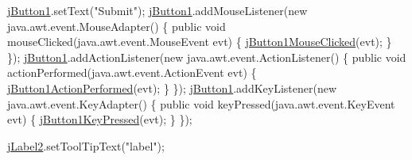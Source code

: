 \begin{DoxyCode}
        \hyperlink{classcom_1_1poly_1_1nlp_1_1filekommander_1_1views_1_1_file_kommander_g_u_i_a7fdc3f53573570f3f345be50e76a0f53}{jButton1}.setText(\textcolor{stringliteral}{"Submit"});
        \hyperlink{classcom_1_1poly_1_1nlp_1_1filekommander_1_1views_1_1_file_kommander_g_u_i_a7fdc3f53573570f3f345be50e76a0f53}{jButton1}.addMouseListener(\textcolor{keyword}{new} java.awt.event.MouseAdapter() \{
            \textcolor{keyword}{public} \textcolor{keywordtype}{void} mouseClicked(java.awt.event.MouseEvent evt) \{
                \hyperlink{classcom_1_1poly_1_1nlp_1_1filekommander_1_1views_1_1_file_kommander_g_u_i_aeaa83ab2594c30896c87c01f5678c8a4}{jButton1MouseClicked}(evt);
            \}
        \});
        \hyperlink{classcom_1_1poly_1_1nlp_1_1filekommander_1_1views_1_1_file_kommander_g_u_i_a7fdc3f53573570f3f345be50e76a0f53}{jButton1}.addActionListener(\textcolor{keyword}{new} java.awt.event.ActionListener() 
      \{
            \textcolor{keyword}{public} \textcolor{keywordtype}{void} actionPerformed(java.awt.event.ActionEvent evt) \{
                \hyperlink{classcom_1_1poly_1_1nlp_1_1filekommander_1_1views_1_1_file_kommander_g_u_i_a01d394178f39508f4fed1735790ba590}{jButton1ActionPerformed}(evt);
            \}
        \});
        \hyperlink{classcom_1_1poly_1_1nlp_1_1filekommander_1_1views_1_1_file_kommander_g_u_i_a7fdc3f53573570f3f345be50e76a0f53}{jButton1}.addKeyListener(\textcolor{keyword}{new} java.awt.event.KeyAdapter() \{
            \textcolor{keyword}{public} \textcolor{keywordtype}{void} keyPressed(java.awt.event.KeyEvent evt) \{
                \hyperlink{classcom_1_1poly_1_1nlp_1_1filekommander_1_1views_1_1_file_kommander_g_u_i_a5b5a0a04cdb90cc03d34d3966b865994}{jButton1KeyPressed}(evt);
            \}
        \});

        \hyperlink{classcom_1_1poly_1_1nlp_1_1filekommander_1_1views_1_1_file_kommander_g_u_i_abc00d454e82d9d65d52df7063d61fe99}{jLabel2}.setToolTipText(\textcolor{stringliteral}{"label"});


\end{DoxyCode}
